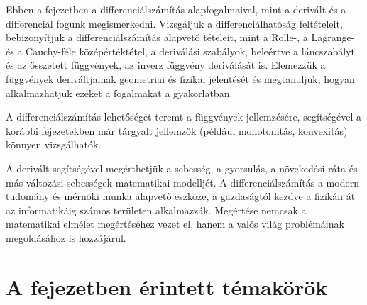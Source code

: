 Ebben a fejezetben a differenciálszámítás alapfogalmaival, mint a derivált és a
differenciál fogunk megismerkedni. Vizsgáljuk a differenciálhatóság feltételeit,
bebizonyítjuk a differenciálszámítás alapvető tételeit, mint a Rolle-, a
Lagrange- és a Cauchy-féle középértéktétel, a deriválási szabályok, beleértve a
láncszabályt és az összetett függvények, az inverz függvény deriválását is.
Elemezzük a függvények deriváltjainak geometriai és fizikai jelentését és
megtanuljuk, hogyan alkalmazhatjuk ezeket a fogalmakat a gyakorlatban.

A differenciálszámítás lehetőséget teremt a függvények jellemzésére,
segítségével a korábbi fejezetekben már tárgyalt jellemzők (például monotonitás,
konvexitás) könnyen vizsgálhatók.

A derivált segítségével megérthetjük a sebesség, a gyorsulás, a növekedési ráta
és más változási sebességek matematikai modelljét. A differenciálszámítás a
modern tudomány és mérnöki munka alapvető eszköze, a gazdaságtól kezdve a
fizikán át az informatikáig számos területen alkalmazzák. Megértése nemcsak a
matematikai elmélet megértéséhez vezet el, hanem a valós világ problémáinak
megoldásához is hozzájárul.


\section*{A fejezetben érintett témakörök}

\hspace{0.0cm}\parbox{14.8cm}{}\par
\hspace{0.3cm}\parbox{14.3cm}{}\par
\hspace{0.6cm}\parbox{13.7cm}{}\par
\hspace{0.8cm}\parbox{13.1cm}{}\par
\hspace{1.0cm}\parbox{12.5cm}{}\par

\egroup

\clearpage
